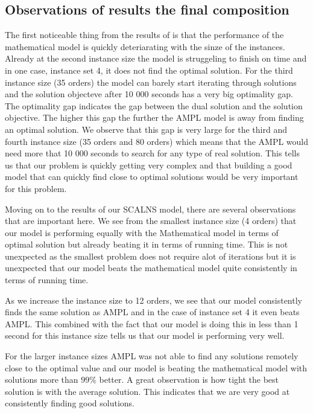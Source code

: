 \documentclass[../main.tex]{subfiles}
\begin{document}
\subsection{Observations of results  the final composition}
\label{sec:finalObs}
The first noticeable thing from the results of  is that the performance of the mathematical model is quickly deteriarating with the sinze of the instances.
Already at the second instance size the model is struggeling to finish on time and in one case, instance set 4, it does not find the optimal solution.
For the third instance size (35 orders) the model can barely start iterating through solutions and the solution objecteve after 10 000 seconds has a very big optimality gap. 
The optimality gap indicates the gap between the dual solution and the solution objective.
The higher this gap the further the AMPL model is away from finding an optimal solution.
We observe that this gap is very large for the third and fourth instance size (35 orders and 80 orders) which means that the AMPL would need more that 10 000 seconds to search for any type of real solution.
This tells us that our problem is quickly getting very complex and that building a good model that can quickly find close to optimal solutions would be very important for this problem.
\par
Moving on to the results of our SCALNS model, there are several observations that are important here. 
We see from the smallest instance size (4 orders) that our model is performing equally with the Mathematical model in terms of optimal solution but already beating it in terms of running time.
This is not unexpected as the smallest problem does not require alot of iterations but it is unexpected that our model beats the mathematical model quite consistently in terms of running time.
\par
As we increase the instance size to 12 orders, we see that our model consistently finds the same solution as AMPL and in the case of instance set 4 it even beats AMPL.
This combined with the fact that our model is doing this in less than 1 second for this instance size tells us that our model is performing very well.
\par
For the larger instance sizes AMPL was not able to find any solutions remotely close to the optimal value and our model is beating the mathematical model with solutions more than $99\%$ better.
A great observation is how tight the best solution is with the average solution. 
This indicates that we are very good at consistently finding good solutions. 
\end{document}
